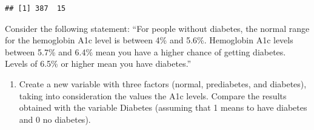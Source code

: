 \documentclass[]{book}
\newenvironment{Shaded}{\begin{snugshade}}{\end{snugshade}}
\newcommand{\DataTypeTok}[1]{\textcolor[rgb]{0.13,0.29,0.53}{#1}}
\newcommand{\DecValTok}[1]{\textcolor[rgb]{0.00,0.00,0.81}{#1}}
\newcommand{\FloatTok}[1]{\textcolor[rgb]{0.00,0.00,0.81}{#1}}
\newcommand{\KeywordTok}[1]{\textcolor[rgb]{0.13,0.29,0.53}{\textbf{#1}}}
\newcommand{\NormalTok}[1]{#1}
\newcommand{\OperatorTok}[1]{\textcolor[rgb]{0.81,0.36,0.00}{\textbf{#1}}}
\newcommand{\StringTok}[1]{\textcolor[rgb]{0.31,0.60,0.02}{#1}}
\providecommand{\tightlist}{%
  \setlength{\itemsep}{0pt}\setlength{\parskip}{0pt}}
\begin{document}
\begin{verbatim}
## [1] 387  15
\end{verbatim}

Consider the following statement: ``For people without diabetes, the normal range for the hemoglobin A1c level is between 4\% and 5.6\%. Hemoglobin A1c levels between 5.7\% and 6.4\% mean you have a higher chance of getting diabetes. Levels of 6.5\% or higher mean you have diabetes.''

\begin{enumerate}
\def\labelenumi{\arabic{enumi}.}
\setcounter{enumi}{4}
\tightlist
\item
  Create a new variable with three factors (normal, prediabetes, and diabetes), taking into consideration the values the A1c levels. Compare the results obtained with the variable Diabetes (assuming that 1 means to have diabetes and 0 no diabetes).
\end{enumerate}

\begin{Shaded}
\end{Shaded}
\end{document}
